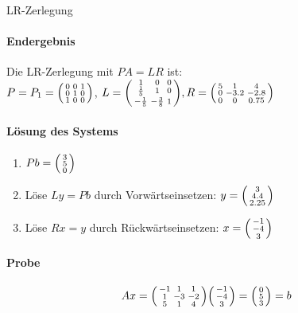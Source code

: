 \begin{example2}[breakable]{LR-Zerlegung}
\paragraph{Endergebnis}
Die LR-Zerlegung mit $PA = LR$ ist:
\vspace{2mm}\\
$P = P_1 = \begin{psmallmatrix}
0 & 0 & 1\\
0 & 1 & 0\\
1 & 0 & 0
\end{psmallmatrix}$, 
$L = \begin{psmallmatrix}
1 & 0 & 0\\
\frac{1}{5} & 1 & 0\\
-\frac{1}{5} & -\frac{3}{8} & 1
\end{psmallmatrix}, 
R = \begin{psmallmatrix}
5 & 1 & 4\\
0 & -3.2 & -2.8\\
0 & 0 & 0.75
\end{psmallmatrix}$

\paragraph{Lösung des Systems}
\begin{enumerate}
    \item $Pb = \begin{psmallmatrix} 3\\ 5\\ 0 \end{psmallmatrix}$
    \item Löse $Ly = Pb$ durch Vorwärtseinsetzen:
    $y = \begin{psmallmatrix} 3\\ 4.4\\ 2.25 \end{psmallmatrix}$
    \item Löse $Rx = y$ durch Rückwärtseinsetzen:
    $x = \begin{psmallmatrix} -1\\ -4\\ 3 \end{psmallmatrix}$
\end{enumerate}

\paragraph{Probe}
$$Ax = \begin{psmallmatrix}
-1 & 1 & 1\\
1 & -3 & -2\\
5 & 1 & 4
\end{psmallmatrix} \begin{psmallmatrix} -1\\ -4\\ 3 \end{psmallmatrix} = \begin{psmallmatrix} 0\\ 5\\ 3 \end{psmallmatrix} = b$$
\end{example2}

